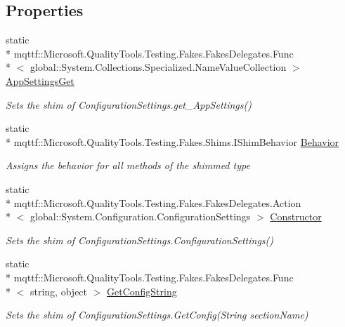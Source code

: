 \subsection*{Properties}
\begin{DoxyCompactItemize}
\item 
static \\*
mqttf\-::\-Microsoft.\-Quality\-Tools.\-Testing.\-Fakes.\-Fakes\-Delegates.\-Func\\*
$<$ global\-::\-System.\-Collections.\-Specialized.\-Name\-Value\-Collection $>$ \hyperlink{class_system_1_1_configuration_1_1_fakes_1_1_shim_configuration_settings_a4533b38e16dc3030ef2f6982415c8be8}{App\-Settings\-Get}
\begin{DoxyCompactList}\small\item\em Sets the shim of Configuration\-Settings.\-get\-\_\-\-App\-Settings()\end{DoxyCompactList}\item 
static \\*
mqttf\-::\-Microsoft.\-Quality\-Tools.\-Testing.\-Fakes.\-Shims.\-I\-Shim\-Behavior \hyperlink{class_system_1_1_configuration_1_1_fakes_1_1_shim_configuration_settings_a4e604f8a7363d93b1a102774df96f486}{Behavior}
\begin{DoxyCompactList}\small\item\em Assigns the behavior for all methods of the shimmed type\end{DoxyCompactList}\item 
static \\*
mqttf\-::\-Microsoft.\-Quality\-Tools.\-Testing.\-Fakes.\-Fakes\-Delegates.\-Action\\*
$<$ global\-::\-System.\-Configuration.\-Configuration\-Settings $>$ \hyperlink{class_system_1_1_configuration_1_1_fakes_1_1_shim_configuration_settings_a7053f5d2afccf7ade0461b398cfc22e9}{Constructor}
\begin{DoxyCompactList}\small\item\em Sets the shim of Configuration\-Settings.\-Configuration\-Settings()\end{DoxyCompactList}\item 
static \\*
mqttf\-::\-Microsoft.\-Quality\-Tools.\-Testing.\-Fakes.\-Fakes\-Delegates.\-Func\\*
$<$ string, object $>$ \hyperlink{class_system_1_1_configuration_1_1_fakes_1_1_shim_configuration_settings_a9a037d2a857b4aac40852c2f6d7637e9}{Get\-Config\-String}
\begin{DoxyCompactList}\small\item\em Sets the shim of Configuration\-Settings.\-Get\-Config(\-String section\-Name)\end{DoxyCompactList}\end{DoxyCompactItemize}


